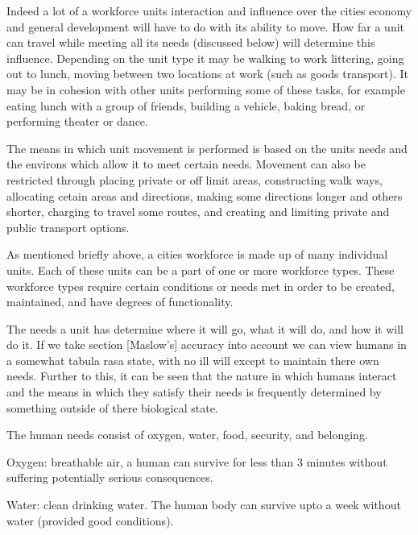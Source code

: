 Indeed a lot of a workforce units interaction and influence over the cities economy and general development will have to do with its ability to move. How far a unit can travel while meeting all its needs (discussed below) will determine this influence. Depending on the unit type it may be walking to work littering, going out to lunch, moving between two locations at work (such as goods transport). It may be in cohesion with other units performing some of these tasks, for example eating lunch with a group of friends, building a vehicle, baking bread, or performing theater or dance. 

The means in which unit movement is performed is based on the units needs and the environs which allow it to meet certain needs. Movement can also be restricted through placing private or off limit areas, constructing walk ways, allocating cetain areas and directions, making some directions longer and others shorter, charging to travel some routes, and creating and limiting private and public transport options. 







As mentioned briefly above, a cities workforce is made up of many individual units. Each of these units can be a part of one or more workforce types. These workforce types require certain conditions or needs met in order to be created, maintained, and have degrees of functionality. 

The needs a unit has determine where it will go, what it will do, and how it will do it. If we take section [Maslow's] accuracy into account we can view humans in a somewhat tabula rasa state, with no ill will except to maintain there own needs. Further to this, it can be seen that the nature in which humans interact and the means in which they satisfy their needs is frequently determined by something outside of there biological state. 

The human needs consist of oxygen, water, food, security, and belonging.



Oxygen: breathable air, a human can survive for less than 3 minutes without suffering potentially serious consequences. 

Water: clean drinking water. The human body can survive upto a week without water (provided good conditions). 

